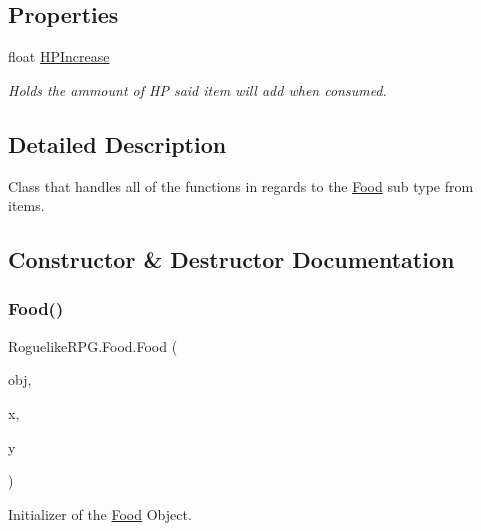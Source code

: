 \subsection*{Properties}
\begin{DoxyCompactItemize}
\item 
float \mbox{\hyperlink{class_roguelike_r_p_g_1_1_food_a644766aa45f4a118e3b2857c21221352}{H\+P\+Increase}}
\begin{DoxyCompactList}\small\item\em Holds the ammount of HP said item will add when consumed. \end{DoxyCompactList}\end{DoxyCompactItemize}


\subsection{Detailed Description}
Class that handles all of the functions in regards to the \mbox{\hyperlink{class_roguelike_r_p_g_1_1_food}{Food}} sub type from items. 



\subsection{Constructor \& Destructor Documentation}
\mbox{\label{class_roguelike_r_p_g_1_1_food_adab425fc62ac669c0c0155f1fa109dab}} 
\subsubsection{\texorpdfstring{Food()}{Food()}}
{\footnotesize\ttfamily Roguelike\+R\+P\+G.\+Food.\+Food (\begin{DoxyParamCaption}\item[{\mbox{\hyperlink{struct_roguelike_r_p_g_1_1_object_data}{Object\+Data}}}]{obj,  }\item[{int}]{x,  }\item[{int}]{y }\end{DoxyParamCaption})\hspace{0.3cm}{\ttfamily [inline]}}



Initializer of the \mbox{\hyperlink{class_roguelike_r_p_g_1_1_food}{Food}} Object. 


